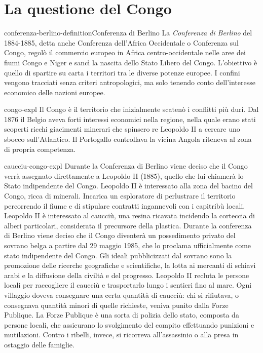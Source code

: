 \documentclass[preview]{standalone}
\begin{document}
\section{La questione del Congo}

\begin{snippetdefinition}{conferenza-berlino-definition}{Conferenza di Berlino}
    La \textit{Conferenza di Berlino} del 1884-1885,
    detta anche Conferenza dell'Africa Occidentale o Conferenza sul Congo,
    regolò il commercio europeo in Africa
    centro-occidentale nelle aree dei fiumi Congo e Niger e sancì la
    nascita dello Stato Libero del Congo.
    L'obiettivo è quello di spartire su carta i territori tra le diverse potenze europee. 
    I confini vengono tracciati senza criteri antropologici,
    ma solo tenendo conto dell'interesse economico
    delle nazioni europee.
\end{snippetdefinition}

\begin{snippet}{congo-expl}
    Il Congo è il territorio che inizialmente scatenò i conflitti più duri.
    Dal 1876 il Belgio aveva forti interessi economici nella regione, nella quale
    erano stati scoperti ricchi giacimenti minerari che spinsero re Leopoldo II a cercare
    uno sbocco sull'Atlantico. Il Portogallo controllava la vicina Angola riteneva al zona di propria competenza.
\end{snippet}

\begin{snippet}{caucciu-congo-expl}
    Durante la Conferenza di Berlino viene deciso che il Congo verrà assegnato
    direttamente a Leopoldo II (1885), quello che lui chiamerà lo Stato indipendente del Congo.
    Leopoldo II è interessato alla zona del bacino del Congo, ricca di
    minerali. Incarica un esploratore di perlustrare il territorio percorrendo il fiume e di stipulare
    contratti ingannevoli con i capitribù locali. Leopoldo II è interessato al caucciù, una resina
    ricavata incidendo la corteccia di alberi particolari, considerata il precursore della plastica.
    Durante la conferenza di Berlino viene deciso che il Congo diventerà un possedimento
    privato del sovrano belga a partire dal 29 maggio 1985, che lo proclama ufficialmente come
    stato indipendente del Congo. Gli ideali pubblicizzati dal sovrano sono la promozione delle
    ricerche geografiche e scientifiche, la lotta ai mercanti di schiavi arabi e la diffusione della
    civiltà e del progresso. Leopoldo II recluta le persone locali per raccogliere il caucciù e
    trasportarlo lungo i sentieri fino al mare. Ogni villaggio doveva consegnare una certa
    quantità di caucciù: chi si rifiutava, o consegnava quantità minori di quelle richieste, veniva
    punito dalla Forze Publique. La Forze Publique è una sorta di polizia dello stato, composta
    da persone locali, che assicurano lo svolgimento del compito effettuando punizioni e
    mutilazioni. Contro i ribelli, invece, si ricorreva all'assassinio o alla presa in ostaggio delle
    famiglie.
\end{snippet}
\end{document}
